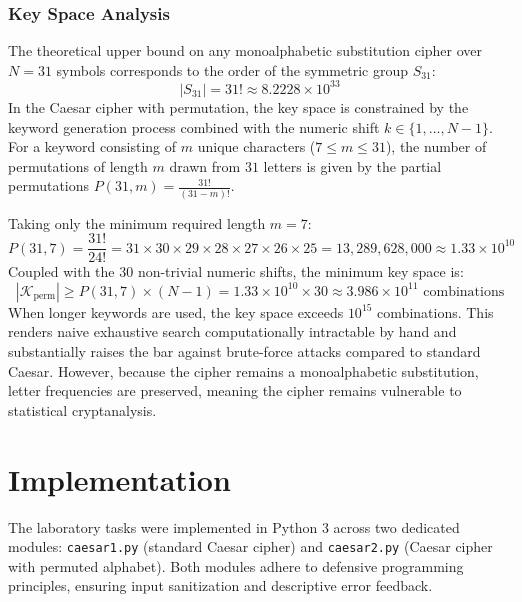 \documentclass{labreport}
\begin{document}
\subsubsection{Key Space Analysis}
The theoretical upper bound on any monoalphabetic substitution cipher over $N = 31$ symbols corresponds to the order of the symmetric group $S_{31}$:
\begin{equation}
|S_{31}| = 31! \approx 8.2228 \times 10^{33}
\end{equation}
In the Caesar cipher with permutation, the key space is constrained by the keyword generation process combined with the numeric shift $k \in \{1, \dots, N-1\}$. For a keyword consisting of $m$ unique characters ($7 \le m \le 31$), the number of permutations of length $m$ drawn from $31$ letters is given by the partial permutations $P(31, m) = \frac{31!}{(31-m)!}$.

Taking only the minimum required length $m = 7$:
\begin{equation}
P(31, 7) = \frac{31!}{24!} = 31 \times 30 \times 29 \times 28 \times 27 \times 26 \times 25 = 13,289,628,000 \approx 1.33 \times 10^{10}
\end{equation}
Coupled with the 30 non-trivial numeric shifts, the minimum key space is:
\begin{equation}
|\mathcal{K}_{\text{perm}}| \ge P(31, 7) \times (N - 1) = 1.33 \times 10^{10} \times 30 \approx 3.986 \times 10^{11} \text{ combinations}
\end{equation}
When longer keywords are used, the key space exceeds $10^{15}$ combinations. This renders naive exhaustive search computationally intractable by hand and substantially raises the bar against brute-force attacks compared to standard Caesar. However, because the cipher remains a monoalphabetic substitution, letter frequencies are preserved, meaning the cipher remains vulnerable to statistical cryptanalysis.

\newpage

\section{Implementation}

The laboratory tasks were implemented in Python 3 across two dedicated modules: \texttt{caesar1.py} (standard Caesar cipher) and \texttt{caesar2.py} (Caesar cipher with permuted alphabet). Both modules adhere to defensive programming principles, ensuring input sanitization and descriptive error feedback.
\end{document}
